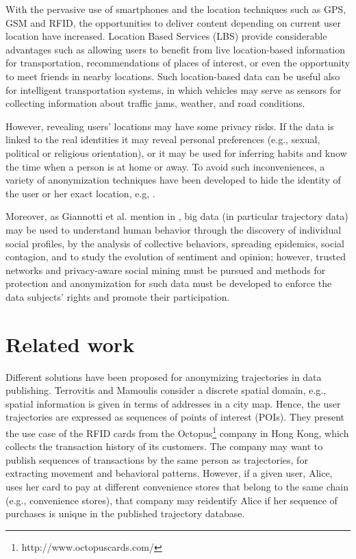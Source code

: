 \documentclass[review]{elsarticle}
\begin{document}
With the pervasive use of smartphones and the location techniques such as GPS, GSM and RFID, the opportunities to deliver content depending on current user location have increased.
Location Based Services (LBS) provide considerable advantages such as allowing users to benefit from live
location-based information for transportation, recommendations of places of interest, or even the opportunity to meet friends in nearby locations.
Such location-based data can be useful also for intelligent transportation systems, in which vehicles may serve as sensors for collecting information about traffic jams, weather, and road conditions.


However, revealing users' locations may have some privacy risks. If the data is linked to the real identities it may reveal personal preferences (e.g., sexual, political or religious orientation), or it may be used for inferring habits and know the time when a person is at home or away.
To avoid such inconveniences, a variety of anonymization techniques have been developed to hide the identity of the user or her exact location, e.g, \cite{Terrovitis:2011}.


Moreover, as Giannotti et al. mention in \cite{Giannotti2012}, big data (in particular trajectory data) may be used  to understand human behavior through the discovery of individual social profiles, by the analysis of collective behaviors, spreading epidemics, social contagion, and to study the evolution of sentiment and opinion; however, trusted networks and privacy-aware social mining must be pursued and methods for protection and anonymization for such data must be developed to enforce the data subjects' rights and promote their participation.

\section{Related work}
Different solutions have been proposed for anonymizing trajectories in data publishing. 
Terrovitis and Mamoulis \cite{Terrovitis:2008} consider a discrete spatial domain, e.g., spatial information is given in terms of addresses in a city map.
Hence, the user trajectories are expressed as sequences of points of interest (POIs).
They present the use case of the RFID cards from the Octopus\footnote{http://www.octopuscards.com/} company in Hong Kong, which collects the transaction history of its customers. The company may want to publish sequences of transactions by the same person as trajectories, for extracting movement and behavioral patterns. However, if a given user, Alice, uses her card to pay at different convenience stores that belong to the same chain (e.g., convenience stores), that company may reidentify Alice if her sequence of purchases is unique in the published trajectory database.
\end{document}
